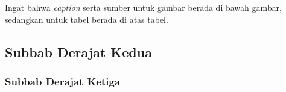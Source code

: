 \begin{remark}
    Ingat bahwa \textit{caption} serta sumber untuk gambar berada di bawah gambar, sedangkan untuk tabel berada di atas tabel.
\end{remark}
\subsection{Subbab Derajat Kedua}
\lipsum[1]

\subsubsection{Subbab Derajat Ketiga}
\lipsum[1]